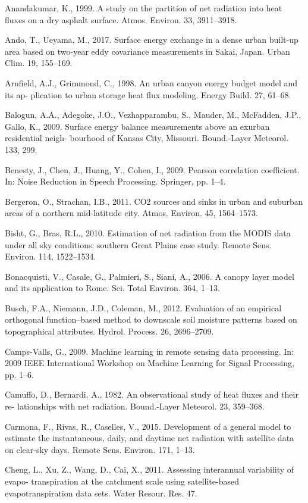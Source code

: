 \documentclass[3p,times]{elsarticle}
\begin{document}
Anandakumar, K., 1999. A study on the partition of net radiation into heat fluxes on a dry asphalt surface. Atmos. Environ. 33, 3911–3918.

Ando, T., Ueyama, M., 2017. Surface energy exchange in a dense urban built-up area based on two-year eddy covariance measurements in Sakai, Japan. Urban Clim. 19, 155–169.

Arnfield, A.J., Grimmond, C., 1998. An urban canyon energy budget model and its ap- plication to urban storage heat flux modeling. Energy Build. 27, 61–68.

Balogun, A.A., Adegoke, J.O., Vezhapparambu, S., Mauder, M., McFadden, J.P., Gallo, K., 2009. Surface energy balance measurements above an exurban residential neigh- bourhood of Kansas City, Missouri. Bound.-Layer Meteorol. 133, 299.

Benesty, J., Chen, J., Huang, Y., Cohen, I., 2009. Pearson correlation coefficient. In: Noise Reduction in Speech Processing. Springer, pp. 1–4.

Bergeron, O., Strachan, I.B., 2011. CO2 sources and sinks in urban and suburban areas of a northern mid-latitude city. Atmos. Environ. 45, 1564–1573.

Bisht, G., Bras, R.L., 2010. Estimation of net radiation from the MODIS data under all sky conditions: southern Great Plains case study. Remote Sens. Environ. 114, 1522–1534.

Bonacquisti, V., Casale, G., Palmieri, S., Siani, A., 2006. A canopy layer model and its application to Rome. Sci. Total Environ. 364, 1–13.

Busch, F.A., Niemann, J.D., Coleman, M., 2012. Evaluation of an empirical orthogonal function–based method to downscale soil moisture patterns based on topographical attributes. Hydrol. Process. 26, 2696–2709.

Camps-Valls, G., 2009. Machine learning in remote sensing data processing. In: 2009 IEEE International Workshop on Machine Learning for Signal Processing, pp. 1–6.

Camuffo, D., Bernardi, A., 1982. An observational study of heat fluxes and their re- lationships with net radiation. Bound.-Layer Meteorol. 23, 359–368.

Carmona, F., Rivas, R., Caselles, V., 2015. Development of a general model to estimate the instantaneous, daily, and daytime net radiation with satellite data on clear-sky days. Remote Sens. Environ. 171, 1–13.

Cheng, L., Xu, Z., Wang, D., Cai, X., 2011. Assessing interannual variability of evapo- transpiration at the catchment scale using satellite-based evapotranspiration data sets. Water Resour. Res. 47.
\end{document}
